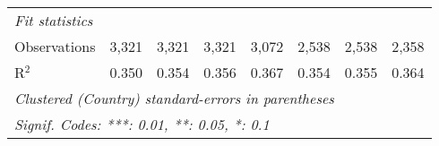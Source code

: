\begin{tabular}{lccccccc}
   \midrule \emph{Fit statistics}\\
   Observations                                                       & 3,321          & 3,321         & 3,321          & 3,072         & 2,538         & 2,538         & 2,358\\  
   R$^2$                                                              & 0.350          & 0.354         & 0.356          & 0.367         & 0.354         & 0.355         & 0.364\\  
   \midrule
   \multicolumn{8}{l}{\emph{Clustered (Country) standard-errors in parentheses}}\\
   \multicolumn{8}{l}{\emph{Signif. Codes: ***: 0.01, **: 0.05, *: 0.1}}\\
\end{tabular}
\par\endgroup


